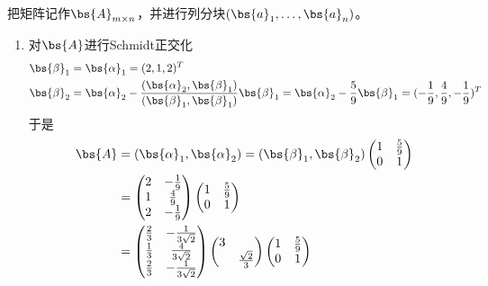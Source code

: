\documentclass[12pt, a4paper, oneside, UTF8]{ctexbook}
\begin{document}
\begin{solution}
    把矩阵记作$\bs{A}_{m\times n}$，并进行列分块$(\bs{a}_1,\ldots,\bs{a}_n)$。
    \begin{enumerate}[label=(\arabic*)]
        \item 对$\bs{A}$进行Schmidt正交化
        \begin{align*}
            \bs{\beta}_1&=\bs{\alpha}_1=(2,1,2)^T \\
            \bs{\beta}_2&=\bs{\alpha}_2-\frac{(\bs{\alpha}_2,\bs{\beta}_1)}{(\bs{\beta}_1,\bs{\beta}_1)}\bs{\beta}_1
            =\bs{\alpha}_2-\frac{5}{9}\bs{\beta}_1=
            (-\frac{1}{9},\frac{4}{9},-\frac{1}{9})^T
        \end{align*}
        于是
        \begin{align*}
            \bs{A}&
            =(\bs{\alpha}_1,\bs{\alpha}_2)=(\bs{\beta}_1,\bs{\beta}_2)\begin{pmatrix}
                1 &\frac{5}{9}\\
                0 & 1
            \end{pmatrix}\\
            &=\begin{pmatrix}
                2& -\frac{1}{9}\\
                1& \frac{4}{9}\\
                2&-\frac{1}{9}
            \end{pmatrix}
                \begin{pmatrix}
                1 &\frac{5}{9}\\
                0 & 1
            \end{pmatrix}\\
            &=\begin{pmatrix}
                \frac{2}{3}& -\frac{1}{3\sqrt{2}}\\
                \frac{1}{3}& \frac{4}{3\sqrt{2}}\\
                \frac{2}{3}&-\frac{1}{3\sqrt{2}}
            \end{pmatrix}
            \begin{pmatrix}
                3 & \\
                & \frac{\sqrt{2}}{3}
            \end{pmatrix}
                \begin{pmatrix}
                1 &\frac{5}{9}\\
                0 & 1
            \end{pmatrix}\\

\end{align*}
\end{enumerate}
\end{solution}
\end{document}
